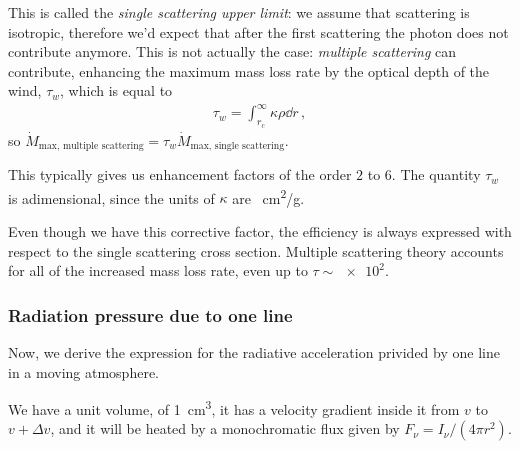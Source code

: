 \documentclass[main.tex]{subfiles}
\begin{document}
This is called the \emph{single scattering upper limit}: we assume that scattering is isotropic, therefore we'd expect that after the first scattering the photon does not contribute anymore.
This is not actually the case: \emph{multiple scattering} can contribute, enhancing the maximum mass loss rate by the optical depth of the wind, \(\tau_{w}\), which is equal to 
%
\begin{align}
\tau_{w} = \int _{r_c}^{\infty} \kappa \rho \dd{r} 
\,,
\end{align}
%
so \(\dot{M} _{\text{max, multiple scattering}} =\tau_{w} \dot{M} _{\text{max, single scattering}}\).

This typically gives us enhancement factors of the order \(2\) to \(6\).
The quantity \(\tau _w\) is adimensional, since the units of \(\kappa \) are \SI{}{cm^2/g}.

Even though we have this corrective factor, the efficiency is always expressed with respect to the single scattering cross section.
Multiple scattering theory accounts for all of the increased mass loss rate, even up to \(\tau \sim \num{e2}\).


\subsubsection{Radiation pressure due to one line}

Now, we derive the expression for the radiative acceleration privided by one line in a moving atmosphere.

We have a unit volume, of \SI{1}{cm^3}, it has a velocity gradient inside it from \(v\) to \(v + \Delta v\), and it will be heated by a monochromatic flux given by \(F_{\nu } = I_{\nu } / (4 \pi r^2)\).
\end{document}
